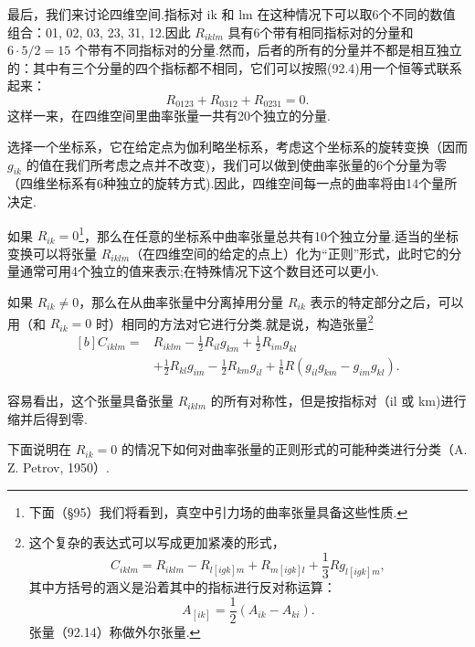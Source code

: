 最后，我们来讨论四维空间.指标对 ik 和 lm 在这种情况下可以取6个不同的数值组合：01, 02, 03, 23, 31, 12.因此 $R_{iklm}$ 具有6个带有相同指标对的分量和 $6\cdot5/2=15$ 个带有不同指标对的分量.然而，后者的所有的分量并不都是相互独立的：其中有三个分量的四个指标都不相同，它们可以按照(92.4)用一个恒等式联系起来：
\begin{equation}
  R_{0123}+R_{0312}+R_{0231}=0.
\end{equation}
这样一来，在四维空间里曲率张量一共有20个独立的分量.

选择一个坐标系，它在给定点为伽利略坐标系，考虑这个坐标系的旋转变换（因而 $g_{ik}$ 的值在我们所考虑之点并不改变)，我们可以做到使曲率张量的6个分量为零（四维坐标系有6种独立的旋转方式).因此，四维空间每一点的曲率将由14个量所决定.

如果 $R_{ik}=0$\footnote{下面（§95）我们将看到，真空中引力场的曲率张量具备这些性质.}，那么在任意的坐标系中曲率张量总共有10个独立分量.适当的坐标变换可以将张量 $R_{iklm}$（在四维空间的给定的点上）化为“正则”形式，此时它的分量通常可用4个独立的值来表示;在特殊情况下这个数目还可以更小.

如果 $R_{ik}\neq0$，那么在从曲率张量中分离掉用分量 $R_{ik}$ 表示的特定部分之后，可以用（和 $R_{ik}=0$ 时）相同的方法对它进行分类.就是说，构造张量\footnote{这个复杂的表达式可以写成更加紧凑的形式，
\begin{equation*}
  C_{iklm}=R_{iklm}-R_{l[igk]m}+R_{m[igk]l}+\frac{1}{3}Rg_{l[igk]m},
\end{equation*}
其中方括号的涵义是沿着其中的指标进行反对称运算：
\begin{equation*}
  A_{[ik]}=\frac{1}{2}(A_{ik}-A_{ki}).
\end{equation*}
张量（92.14）称做外尔张量.}
\begin{equation}
\begin{aligned}[b]
  C_{iklm}={}&R_{iklm}-\frac{1}{2}R_{il}g_{km}
  +\frac{1}{2}R_{im}g_{kl}\\
  &+\frac{1}{2}R_{kl}g_{im}-\frac{1}{2}R_{km}g_{il}
  +\frac{1}{6}R\left(g_{il}g_{km}-g_{im}g_{kl}\right).
\end{aligned}
\end{equation}

容易看出，这个张量具备张量 $R_{iklm}$ 的所有对称性，但是按指标对（il 或 km)进行缩并后得到零.

下面说明在 $R_{ik}=0$ 的情况下如何对曲率张量的正则形式的可能种类进行分类（A. Z. Petrov, 1950）.

